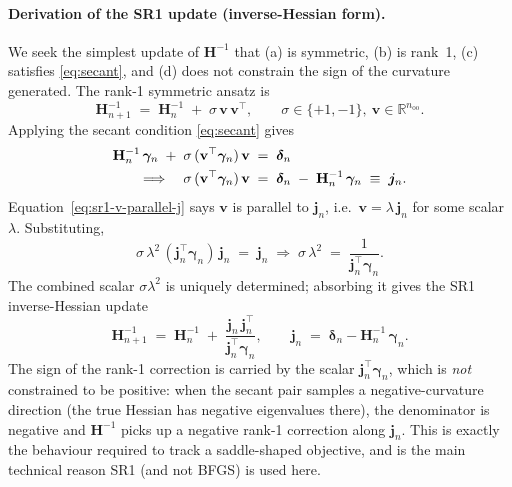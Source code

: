 \documentclass[11pt,a4paper]{article}
\newcommand{\HH}{\mathbf{H}}
\begin{document}
\paragraph{Derivation of the SR1 update (inverse-Hessian form).}
We seek the simplest update of $\HH^{-1}$ that (a) is symmetric,
(b) is rank~1, (c) satisfies \eqref{eq:secant}, and (d) does not
constrain the sign of the curvature generated. The rank-1 symmetric
ansatz is
\begin{equation}
\HH^{-1}_{n+1} \;=\; \HH^{-1}_n \;+\; \sigma\,\mathbf{v}\,\mathbf{v}^{\top},
\qquad \sigma\in\{+1,-1\},\ \mathbf{v}\in\mathbb{R}^{n_\mathrm{oo}}.
\label{eq:sr1ansatz}
\end{equation}
Applying the secant condition \eqref{eq:secant} gives
\begin{align}
\HH^{-1}_n\,\bm{\gamma}_n \;+\; \sigma\,(\mathbf{v}^{\top}\bm{\gamma}_n)\,\mathbf{v}
\;&=\;\bm{\delta}_n \notag\\
\Longrightarrow\quad
\sigma\,(\mathbf{v}^{\top}\bm{\gamma}_n)\,\mathbf{v}
\;&=\;\bm{\delta}_n \;-\; \HH^{-1}_n\,\bm{\gamma}_n
\;\equiv\;\bm{j}_n.
\label{eq:sr1-v-parallel-j}
\end{align}
Equation~\eqref{eq:sr1-v-parallel-j} says $\mathbf{v}$ is parallel to
$\bm{j}_n$, i.e.\ $\mathbf{v}=\lambda\,\bm{j}_n$ for some scalar
$\lambda$. Substituting,
\begin{equation}
\sigma\,\lambda^2\,(\bm{j}_n^{\top}\bm{\gamma}_n)\,\bm{j}_n
\;=\; \bm{j}_n
\;\Longrightarrow\;
\sigma\,\lambda^2\;=\;\frac{1}{\bm{j}_n^{\top}\bm{\gamma}_n}.
\end{equation}
The combined scalar $\sigma\lambda^2$ is uniquely determined; absorbing
it gives the SR1 inverse-Hessian update
\begin{equation}
\boxed{\HH^{-1}_{n+1} \;=\; \HH^{-1}_n \;+\;
\frac{\bm{j}_n\,\bm{j}_n^{\top}}{\bm{j}_n^{\top}\bm{\gamma}_n},
\qquad \bm{j}_n \;=\; \bm{\delta}_n - \HH^{-1}_n\,\bm{\gamma}_n.}
\label{eq:lsr1}
\end{equation}
The sign of the rank-1 correction is carried by the scalar
$\bm{j}_n^{\top}\bm{\gamma}_n$, which is \emph{not} constrained to be
positive: when the secant pair samples a negative-curvature direction
(the true Hessian has negative eigenvalues there), the denominator is
negative and $\HH^{-1}$ picks up a negative rank-1 correction along
$\bm{j}_n$. This is exactly the behaviour required to track a
saddle-shaped objective, and is the main technical reason SR1 (and
not BFGS) is used here.
\end{document}

